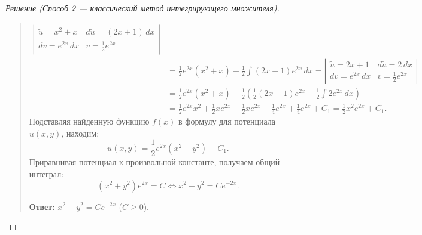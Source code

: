 \begin{proof}[Решение (Способ 2 — классический метод интегрирующего множителя)]
\begin{quote}
\begin{align*}
            \left|
                \begin{array}{ll}
                    \tilde{u} = x^2 + x & d\tilde{u} = (2x + 1) \, dx \\
                    dv = e^{2x} \, dx & v = \frac{1}{2} e^{2x}
                \end{array}
            \right| \\
            &= \frac{1}{2} e^{2x} \left(x^2 + x\right) -
            \frac{1}{2} \int (2x + 1) e^{2x} \, dx =
            \left|
                \begin{array}{ll}
                    \tilde{u} = 2x + 1 & d\tilde{u} = 2 \, dx \\
                    dv = e^{2x} \, dx & v = \frac{1}{2} e^{2x}
                \end{array}
            \right| \\
            &= \frac{1}{2} e^{2x} \left(x^2 + x\right) -
            \frac{1}{2} \left(\frac{1}{2} (2x + 1) e^{2x} -
            \frac{1}{2} \int 2 e^{2x} \, dx\right) \\
            &= \frac{1}{2} e^{2x} x^2 + \frac{1}{2} x e^{2x} -
            \frac{1}{2} x e^{2x} - \frac{1}{4} e^{2x} +
            \frac{1}{4} e^{2x} + C_1 = \frac{1}{2} x^2 e^{2x} + C_1.
        \end{align*}
        Подставляя найденную функцию $f(x)$ в формулу для потенциала $u(x, y)$,
        находим:
        \[
            u(x, y) = \frac{1}{2} e^{2x} \left(x^2 + y^2\right) + C_1.
        \]
        Приравнивая потенциал к произвольной константе, получаем общий интеграл:
        \[
            \left(x^2 + y^2\right) e^{2x} = C \iff x^2 + y^2 = C e^{-2x}.
        \]

        \textbf{Ответ:} $x^2 + y^2 = C e^{-2x}$ ($C \ge 0$).
    \end{quote}
\end{proof}